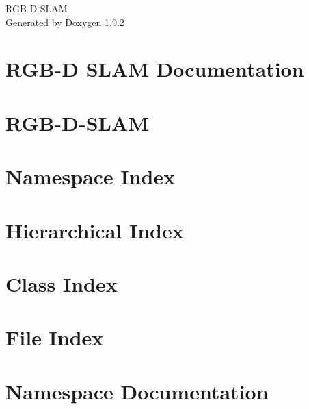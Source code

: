 \documentclass[twoside]{book}
\newcommand{\+}{\discretionary{\mbox{\scriptsize$\hookleftarrow$}}{}{}}
\newcommand{\clearemptydoublepage}{%
    \newpage{\pagestyle{empty}\cleardoublepage}%
  }
\begin{document}
  \raggedbottom
    \hypersetup{pageanchor=false,
                bookmarksnumbered=true,
                pdfencoding=unicode
               }
  \begin{titlepage}
  \vspace*{7cm}
  \begin{center}%
  {\Large RGB-\/\+D SLAM}\\
  \vspace*{1cm}
  {\large Generated by Doxygen 1.9.2}\\
  \end{center}
  \end{titlepage}
  \clearemptydoublepage
  \tableofcontents
  \clearemptydoublepage
  \hypersetup{pageanchor=true}
\chapter{RGB-\/D SLAM Documentation}
\label{index}\hypertarget{index}{}
\chapter{RGB-\/\+D-\/\+SLAM}
\label{md__home_baptou__documents_code_robots__r_g_b__s_l_a_m__r_g_b__d__s_l_a_m__r_e_a_d_m_e}

\chapter{Namespace Index}

\chapter{Hierarchical Index}

\chapter{Class Index}

\chapter{File Index}

\chapter{Namespace Documentation}





\end{document}
